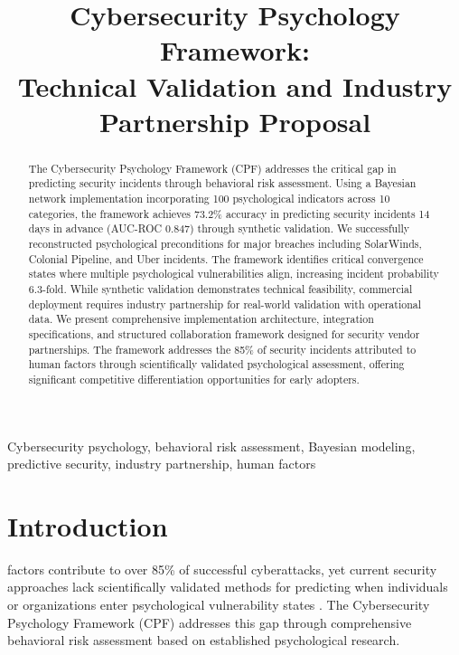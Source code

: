 \documentclass[10pt,twocolumn]{IEEEtran}
\begin{document}
\title{Cybersecurity Psychology Framework: \\
Technical Validation and Industry Partnership Proposal}

\author{
}

\maketitle

\begin{abstract}
The Cybersecurity Psychology Framework (CPF) addresses the critical gap in predicting security incidents through behavioral risk assessment. Using a Bayesian network implementation incorporating 100 psychological indicators across 10 categories, the framework achieves 73.2\% accuracy in predicting security incidents 14 days in advance (AUC-ROC 0.847) through synthetic validation. We successfully reconstructed psychological preconditions for major breaches including SolarWinds, Colonial Pipeline, and Uber incidents. The framework identifies critical convergence states where multiple psychological vulnerabilities align, increasing incident probability 6.3-fold. While synthetic validation demonstrates technical feasibility, commercial deployment requires industry partnership for real-world validation with operational data. We present comprehensive implementation architecture, integration specifications, and structured collaboration framework designed for security vendor partnerships. The framework addresses the 85\% of security incidents attributed to human factors through scientifically validated psychological assessment, offering significant competitive differentiation opportunities for early adopters.
\end{abstract}

\begin{IEEEkeywords}
Cybersecurity psychology, behavioral risk assessment, Bayesian modeling, predictive security, industry partnership, human factors
\end{IEEEkeywords}

\section{Introduction}
 factors contribute to over 85\% of successful cyberattacks, yet current security approaches lack scientifically validated methods for predicting when individuals or organizations enter psychological vulnerability states \cite{verizon2023}. The Cybersecurity Psychology Framework (CPF) addresses this gap through comprehensive behavioral risk assessment based on established psychological research.
\end{document}
